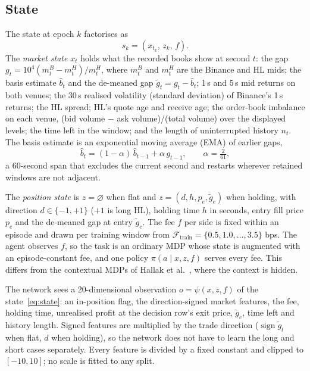 \documentclass[12pt,a4paper]{article}
\DeclareRobustCommand{\bps}{\ifmmode\,\text{bps}\else\,bps\fi}
\newcommand{\gt}{\tilde g}
\newcommand{\bh}{\hat b}
\begin{document}
\subsection{State}
The state at epoch $k$ factorises as
\begin{equation}
s_k=(x_{t_k},\,z_k,\,f).
\label{eq:state}
\end{equation}
The \emph{market state} $x_t$ holds what the recorded books show at second $t$: the gap
$g_t=10^4(m^{B}_t-m^{H}_t)/m^{H}_t$, where $m^B_t$ and $m^H_t$ are the Binance and HL mids;
the basis estimate $\bh_t$ and the de-meaned gap $\gt_t=g_t-\bh_t$; 1\,s and 5\,s mid returns
on both venues; the 30\,s realised volatility (standard deviation) of Binance's 1\,s returns;
the HL spread; HL's quote age and receive age; the order-book imbalance on each venue, (bid
volume $-$ ask volume)/(total volume) over the displayed levels; the time left in the window; and the length of uninterrupted history $n_t$. The basis estimate is an exponential
moving average (EMA) of earlier gaps,
\begin{equation}
\bh_t=(1-\alpha)\,\bh_{t-1}+\alpha\,g_{t-1},\qquad \alpha=\tfrac{2}{61},
\label{eq:ema}
\end{equation}
a 60-second span that excludes the current second and restarts wherever retained windows
are not adjacent.

The \emph{position state} is $z=\varnothing$ when flat and $z=(d,h,p_e,\gt_e)$ when holding,
with direction $d\in\{-1,+1\}$ ($+1$ is long HL), holding time $h$ in seconds, entry fill price
$p_e$ and the de-meaned gap at entry $\gt_e$. The fee $f$ per side is fixed within an episode
and drawn per training window from $\mathcal{F}_{\text{train}}=\{0.5,1.0,\ldots,3.5\}$\bps.
The agent observes $f$, so the task is an ordinary MDP whose state is augmented with an
episode-constant fee, and one policy $\pi(a\mid x,z,f)$ serves every fee. This differs from
the contextual MDPs of Hallak et al.~\cite{cmdp}, where the context is hidden.

The network sees a 20-dimensional observation $o=\psi(x,z,f)$ of the state~\eqref{eq:state}:
an in-position flag, the direction-signed market features, the fee, holding time, unrealised profit at the decision
row's exit price, $\gt_e$, time left and history length. Signed features are multiplied by
the trade direction ($\operatorname{sign}\gt_t$ when flat, $d$ when holding), so the network
does not have to learn the long and short cases separately. Every feature is divided by a
fixed constant and clipped to $[-10,10]$; no scale is fitted to any split.
\end{document}
